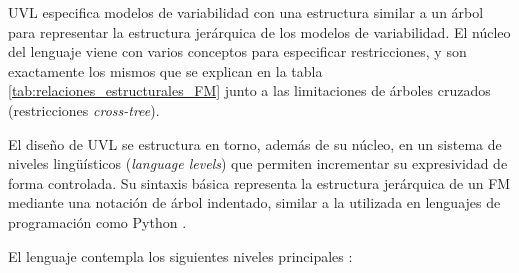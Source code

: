 \ac{UVL} especifica modelos de variabilidad con una estructura similar a 
un árbol para representar la estructura jerárquica de los modelos de variabilidad. 
El núcleo del lenguaje viene con varios conceptos para especificar restricciones, y son exactamente
los mismos que se explican en la tabla \ref{tab:relaciones_estructurales_FM} junto a las limitaciones
de árboles cruzados (restricciones \textit{cross-tree\/}).

El diseño de \ac{UVL} se estructura en torno, además de su núcleo, en un sistema de niveles 
lingüísticos (\textit{language levels}) que permiten incrementar su expresividad de forma 
controlada. Su sintaxis básica representa la estructura jerárquica de un 
\ac{FM} mediante una notación de árbol indentado, similar a la utilizada en 
lenguajes de programación como Python \citep{sundermann2023uvlparser}.


El lenguaje contempla los siguientes niveles principales \citep{universalvariabilitylanguage}:

